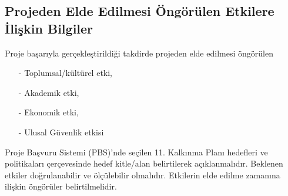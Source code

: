 \documentclass[a4paper]{article}
\begin{document}
\subsection{Projeden Elde Edilmesi Öngörülen Etkilere İlişkin Bilgiler}

\begin{singlespace}
Proje başarıyla gerçekleştirildiği takdirde projeden elde edilmesi öngörülen

\begin{itemize}
\item[-] Toplumsal/kültürel etki,
\item[-] Akademik etki,
\item[-] Ekonomik etki,
\item[-] Ulusal Güvenlik etkisi
\end{itemize}

Proje Başvuru Sistemi (PBS)’nde seçilen 11. Kalkınma Planı hedefleri ve politikaları çerçevesinde hedef kitle/alan
belirtilerek açıklanmalıdır. Beklenen etkiler doğrulanabilir ve ölçülebilir olmalıdır. Etkilerin elde edilme zamanına ilişkin
öngörüler belirtilmelidir.
\end{singlespace}
\end{document}
